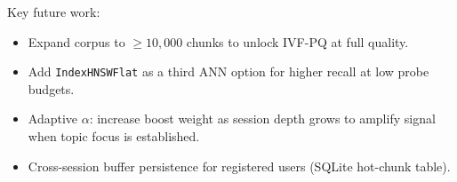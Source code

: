 \documentclass[11pt,letterpaper]{article}
\begin{document}
Key future work:
\begin{itemize}
  \item Expand corpus to $\geq\!10{,}000$ chunks to unlock IVF-PQ at full quality.
  \item Add \texttt{IndexHNSWFlat} as a third ANN option for higher recall at low probe budgets.
  \item Adaptive $\alpha$: increase boost weight as session depth grows to
    amplify signal when topic focus is established.
  \item Cross-session buffer persistence for registered users (SQLite hot-chunk table).
\end{itemize}
\end{document}
